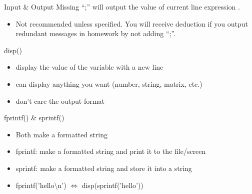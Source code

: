 \begin{frame}{Input \& Output}
Missing ``;'' will output the value of current line expression .
\begin{itemize}
	\item Not recommended unless specified. You will receive deduction if you output redundant messages in homework by not adding ``;''.
\end{itemize}
\begin{block}{disp()}
	\begin{itemize}
		\item display the value of the variable with a new line
		\item can display anything you want (number, string, matrix, etc.)
		\item don't care the output format
	\end{itemize}
\end{block}
\begin{block}{fprintf() \& sprintf()}
	\begin{itemize}
		\item Both make a formatted string
		\item fprintf: make a formatted string and print it to the file/screen
		\item sprintf: make a formatted string and store it into a string
		\item fprintf('hello\textbackslash n') $\Leftrightarrow$ disp(sprintf('hello'))
	\end{itemize}
\end{block}
\end{frame}